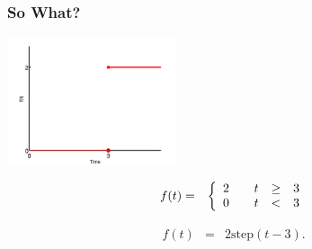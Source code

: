 \begin{frame}
  \frametitle{So What?}

  \centerline{\includegraphics[width=5cm]{img/stepEx1}}

  \begin{eqnarray*}
      f(t) & = & 
      \left\{
        \begin{array}{r@{\hspace{2em}}rcl}
          2 & t & \geq & 3 \\
          0 & t & < & 3
        \end{array}
      \right.
  \end{eqnarray*}

  {
    \begin{eqnarray*}
      f(t) & = & 2\mathrm{step}(t-3).
    \end{eqnarray*}
  }

\end{frame}


